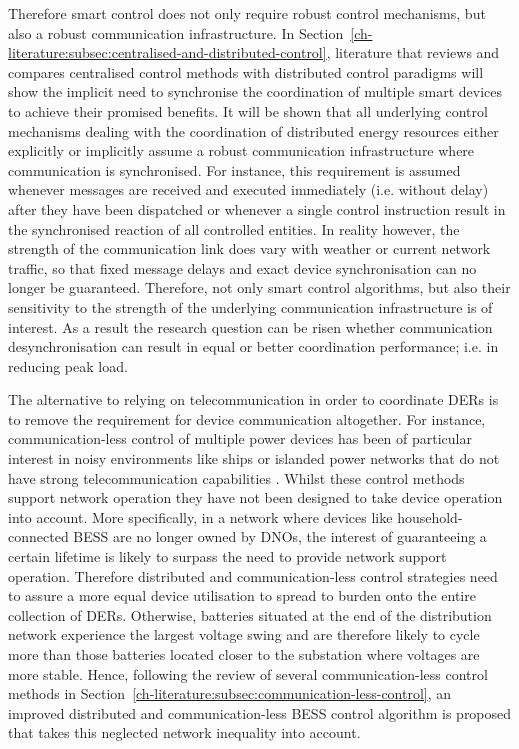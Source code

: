 Therefore smart control does not only require robust control mechanisms, but also a robust communication infrastructure.
In Section~\ref{ch-literature:subsec:centralised-and-distributed-control}, literature that reviews and compares centralised control methods with distributed control paradigms will show the implicit need to synchronise the coordination of multiple smart devices to achieve their promised benefits.
It will be shown that all underlying control mechanisms dealing with the coordination of distributed energy resources either explicitly or implicitly assume a robust communication infrastructure where communication is synchronised.
For instance, this requirement is assumed whenever messages are received and executed immediately (i.e. without delay) after they have been dispatched or whenever a single control instruction result in the synchronised reaction of all controlled entities.
In reality however, the strength of the communication link does vary with weather or current network traffic, so that fixed message delays and exact device synchronisation can no longer be guaranteed.
Therefore, not only smart control algorithms, but also their sensitivity to the strength of the underlying communication infrastructure is of interest.
As a result the research question can be risen whether communication desynchronisation can result in equal or better coordination performance; i.e. in reducing peak load.

The alternative to relying on telecommunication in order to coordinate DERs is to remove the requirement for device communication altogether.
For instance, communication-less control of multiple power devices has been of particular interest in noisy environments like ships \cite{Baldwin2004} or islanded power networks that do not have strong telecommunication capabilities \cite{Diaz2017}.
Whilst these control methods support network operation they have not been designed to take device operation into account.
More specifically, in a network where devices like household-connected BESS are no longer owned by DNOs, the interest of guaranteeing a certain lifetime is likely to surpass the need to provide network support operation.
Therefore distributed and communication-less control strategies need to assure a more equal device utilisation to spread to burden onto the entire collection of DERs.
Otherwise, batteries situated at the end of the distribution network experience the largest voltage swing and are therefore likely to cycle more than those batteries located closer to the substation where voltages are more stable.
Hence, following the review of several communication-less control methods in Section~\ref{ch-literature:subsec:communication-less-control}, an improved distributed and communication-less BESS control algorithm is proposed that takes this neglected network inequality into account.
